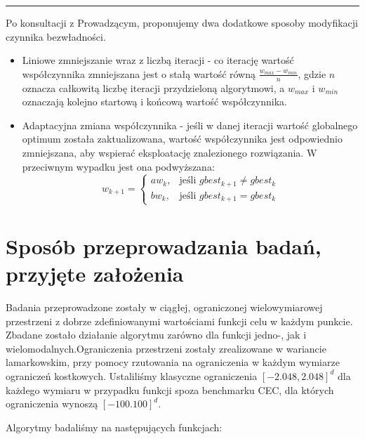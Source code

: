 \documentclass[12pt]{article}
\begin{document}
\begin{center}
	\rule{0.8\linewidth}{0.4pt}
\end{center}

Po konsultacji z Prowadzącym, proponujemy dwa dodatkowe sposoby modyfikacji czynnika bezwładności.
\begin{itemize}
	\item Liniowe zmniejszanie wraz z liczbą iteracji - co iterację wartość współczynnika zmniejszana
	      jest o stałą wartość równą $\frac{w_{max} - w_{min}}{n}$, gdzie $n$ oznacza całkowitą liczbę iteracji
	      przydzieloną algorytmowi, a $w_{max}$ i $w_{min}$ oznaczają kolejno startową i końcową wartość współczynnika.
	\item Adaptacyjna zmiana współczynnika - jeśli w danej iteracji wartość globalnego optimum została zaktualizowana, wartość współczynnika
	      jest odpowiednio zmniejszana, aby wspierać eksploatację znalezionego rozwiązania. W przeciwnym wypadku jest ona podwyższana:
	      \[
		      w_{k+1} =
		      \begin{cases}
			      aw_{k}, & \text{jeśli } gbest_{k+1} \neq gbest_{k} \\
			      bw_{k}, & \text{jeśli } gbest_{k+1} = gbest_{k}
		      \end{cases}
	      \]
\end{itemize}

\section{Sposób przeprowadzania badań, przyjęte założenia}

Badania przeprowadzone zostały w ciągłej, ograniczonej wielowymiarowej przestrzeni z dobrze zdefiniowanymi wartościami funkcji celu w każdym punkcie.
Zbadane zostało działanie algorytmu zarówno dla funkcji jedno-, jak i wielomodalnych.Ograniczenia przestrzeni zostały zrealizowane w wariancie lamarkowskim,
przy pomocy rzutowania na ograniczenia w każdym wymiarze ograniczeń kostkowych. Ustaliliśmy klasyczne ograniczenia $[-2.048, 2.048]^d$ dla każdego wymiaru w przypadku
funkcji spoza benchmarku CEC, dla których ograniczenia wynoszą $[-100. 100]^d$.


Algorytmy badaliśmy na następujących funkcjach:
\end{document}
